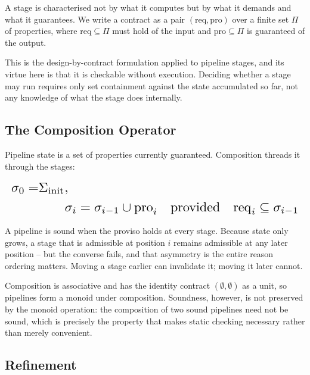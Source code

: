 \documentclass[10pt,journal,compsoc,twocolumn]{IEEEtran}
\begin{document}
A stage is characterised not by what it computes but by what it demands and what it guarantees. We write a contract as a pair $(\mathrm{req}, \mathrm{pro})$ over a finite set $\Pi$ of properties, where $\mathrm{req} \subseteq \Pi$ must hold of the input and $\mathrm{pro} \subseteq \Pi$ is guaranteed of the output.

This is the design-by-contract formulation applied to pipeline stages, and its virtue here is that it is checkable without execution. Deciding whether a stage may run requires only set containment against the state accumulated so far, not any knowledge of what the stage does internally.


\subsection{The Composition Operator}


Pipeline state is a set of properties currently guaranteed. Composition threads it through the stages:








\begin{equation}
\resizebox{\columnwidth}{!}{$\displaystyle
\begin{aligned}
\sigma_0 = & \Sigma_{\text{init}}, \\
& \qquad
\sigma_{i} = \sigma_{i-1} \cup \mathrm{pro}_i \quad \text{provided} \quad \mathrm{req}_i \subseteq \sigma_{i-1}
\end{aligned}
$}
\end{equation}








A pipeline is sound when the proviso holds at every stage. Because state only grows, a stage that is admissible at position $i$ remains admissible at any later position -- but the converse fails, and that asymmetry is the entire reason ordering matters. Moving a stage earlier can invalidate it; moving it later cannot.

Composition is associative and has the identity contract $(\emptyset, \emptyset)$ as a unit, so pipelines form a monoid under composition. Soundness, however, is not preserved by the monoid operation: the composition of two sound pipelines need not be sound, which is precisely the property that makes static checking necessary rather than merely convenient.


\subsection{Refinement}
\end{document}
